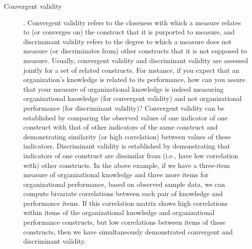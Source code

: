 \begin{description}
	\item[Convergent validity]. Convergent validity refers to the closeness with which a measure relates to (or converges on) the construct that it is purported to measure, and discriminant validity refers to the degree to which a measure does not measure (or discriminates from) other constructs that it is not supposed to measure. Usually, convergent validity and discriminant validity are assessed jointly for a set of related constructs. For instance, if you expect that an organization's knowledge is related to its performance, how can you assure that your measure of organizational knowledge is indeed measuring organizational knowledge (for convergent validity) and not organizational performance (for discriminant validity)? Convergent validity can be established by comparing the observed values of one indicator of one construct with that of other indicators of the same construct and demonstrating similarity (or high correlation) between values of these indicators. Discriminant validity is established by demonstrating that indicators of one construct are dissimilar from (i.e., have low correlation with) other constructs. In the above example, if we have a three-item measure of organizational knowledge and three more items for organizational performance, based on observed sample data, we can compute bivariate correlations between each pair of knowledge and performance items. If this correlation matrix shows high correlations within items of the organizational knowledge and organizational performance constructs, but low correlations between items of these constructs, then we have simultaneously demonstrated convergent and discriminant validity.


\end{description}
